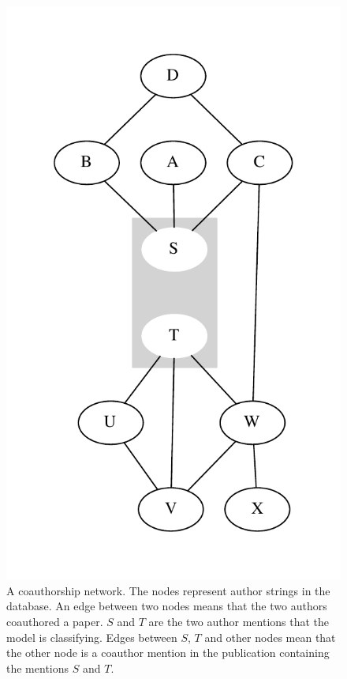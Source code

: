 \documentclass[twocolumn,letterpaper]{article}
\begin{document}
\begin{figure}
\centering
\includegraphics[height=.32\textheight]{coauthor}
\caption{A coauthorship network.  The nodes represent author strings
  in the database.  An edge between two nodes means that the two
  authors coauthored a paper.  $S$ and $T$ are the two author mentions
  that the model is classifying. Edges between $S$, $T$ and other
  nodes mean that the other node is a coauthor mention in the
  publication containing the mentions $S$ and $T$.}
\label{fig:coauthor}
\end{figure}
\end{document}
